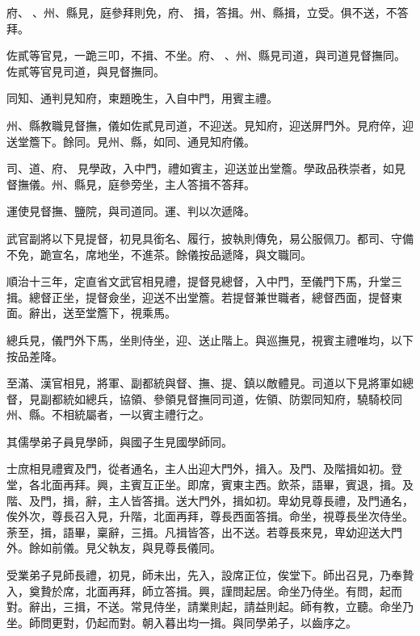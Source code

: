 \begin{pinyinscope}
府、、州、縣見，庭參拜則免，府、揖，答揖。州、縣揖，立受。俱不送，不答拜。

佐貳等官見，一跪三叩，不揖、不坐。府、、州、縣見司道，與司道見督撫同。佐貳等官見司道，與見督撫同。

同知、通判見知府，柬題晚生，入自中門，用賓主禮。

州、縣教職見督撫，儀如佐貳見司道，不迎送。見知府，迎送屏門外。見府倅，迎送堂簷下。餘同。見州、縣，如同、通見知府儀。

司、道、府、見學政，入中門，禮如賓主，迎送並出堂簷。學政品秩崇者，如見督撫儀。州、縣見，庭參旁坐，主人答揖不答拜。

運使見督撫、鹽院，與司道同。運、判以次遞降。

武官副將以下見提督，初見具銜名、履行，披執則傳免，易公服佩刀。都司、守備不免，跪宣名，席地坐，不進茶。餘儀按品遞降，與文職同。

順治十三年，定直省文武官相見禮，提督見總督，入中門，至儀門下馬，升堂三揖。總督正坐，提督僉坐，迎送不出堂簷。若提督兼世職者，總督西面，提督東面。辭出，送至堂簷下，視乘馬。

總兵見，儀門外下馬，坐則侍坐，迎、送止階上。與巡撫見，視賓主禮唯均，以下按品差降。

至滿、漢官相見，將軍、副都統與督、撫、提、鎮以敵體見。司道以下見將軍如總督，見副都統如總兵，協領、參領見督撫同司道，佐領、防禦同知府，驍騎校同州、縣。不相統屬者，一以賓主禮行之。

其儒學弟子員見學師，與國子生見國學師同。

士庶相見禮賓及門，從者通名，主人出迎大門外，揖入。及門、及階揖如初。登堂，各北面再拜。興，主賓互正坐。即席，賓東主西。飲茶，語畢，賓退，揖。及階、及門，揖，辭，主人皆答揖。送大門外，揖如初。卑幼見尊長禮，及門通名，俟外次，尊長召入見，升階，北面再拜，尊長西面答揖。命坐，視尊長坐次侍坐。荼至，揖，語畢，稟辭，三揖。凡揖皆答，出不送。若尊長來見，卑幼迎送大門外。餘如前儀。見父執友，與見尊長儀同。

受業弟子見師長禮，初見，師未出，先入，設席正位，俟堂下。師出召見，乃奉贄入，奠贄於席，北面再拜，師立答揖。興，謹問起居。命坐乃侍坐。有問，起而對。辭出，三揖，不送。常見侍坐，請業則起，請益則起。師有教，立聽。命坐乃坐。師問更對，仍起而對。朝入暮出均一揖。與同學弟子，以齒序之。


\end{pinyinscope}